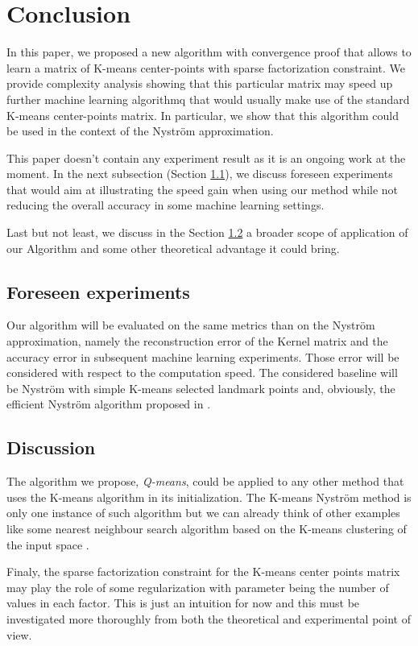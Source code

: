 \section{Conclusion}
\label{sec:conclusion}

In this paper, we proposed a new algorithm with convergence proof that allows to learn a matrix of K-means center-points with sparse factorization constraint. We provide complexity analysis showing that this particular matrix may speed up further machine learning algorithmq that would usually make use of the standard K-means center-points matrix. In particular, we show that this algorithm could be used in the context of the Nyström approximation.

This paper doesn't contain any experiment result as it is an ongoing work at the moment. In the next subsection (Section \ref{sec:foreseen_experiments}), we discuss foreseen experiments that would aim at illustrating the speed gain when using our method while not reducing the overall accuracy in some machine learning settings.

Last but not least, we discuss in the Section \ref{sec:discussion} a broader scope of application of our Algorithm and some other theoretical advantage it could bring.

\subsection{Foreseen experiments}
\label{sec:foreseen_experiments}

Our algorithm will be evaluated on the same metrics than \cite{si2016computationally} on the Nyström approximation, namely the reconstruction error of the Kernel matrix and the accuracy error in subsequent machine learning experiments. Those error will be considered with respect to the computation speed. The considered baseline will be Nyström with simple K-means selected landmark points and, obviously, the efficient Nyström algorithm proposed in \cite{si2016computationally}.

\subsection{Discussion}
\label{sec:discussion}

The algorithm we propose, \textit{Q-means}, could be applied to any other method that uses the K-means algorithm in its initialization. The K-means Nyström method is only one instance of such algorithm but we can already think of other examples like some nearest neighbour search algorithm based on the K-means clustering of the input space \cite{wang2011fast}.

Finaly, the sparse factorization constraint for the K-means center points matrix may play the role of some regularization with parameter being the number of values in each factor. This is just an intuition for now and this must be investigated more thoroughly from both the theoretical and experimental point of view.

